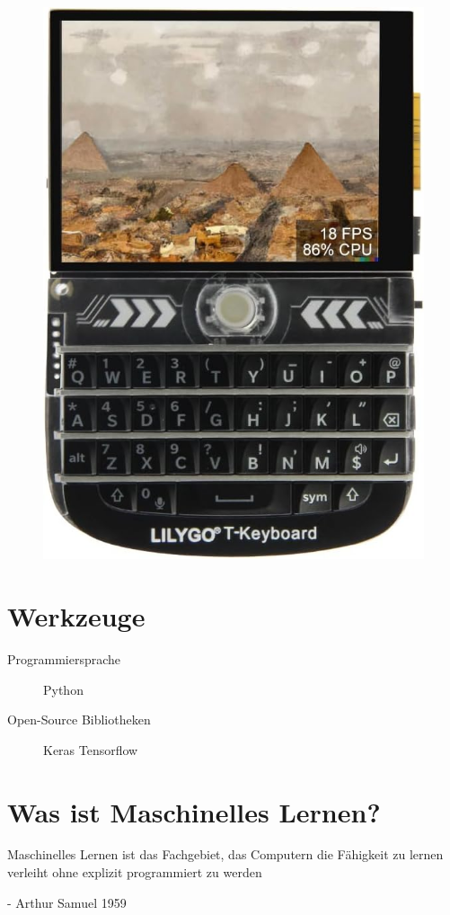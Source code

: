 \documentclass[12pt,a4paper]{article}
\begin{document}
\begin{figure}
	\includegraphics[scale=0.1]{t-deck.jpg}
\end{figure}


\section{Werkzeuge}
\begin{description}


    \item [Programmiersprache]\tab Python
    \item [Open-Source Bibliotheken]\tab Keras \newline \tab \tab Tensorflow
 
 
\end{description}

\section{Was ist Maschinelles Lernen?}
Maschinelles Lernen ist das Fachgebiet, das Computern die Fähigkeit zu lernen verleiht ohne explizit programmiert zu werden
\begin{flushright} - Arthur Samuel 1959  \end{flushright}
\end{document}
